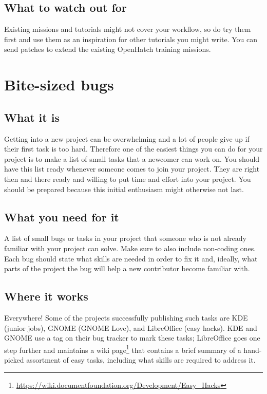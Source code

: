 \subsection{What to watch out for}
Existing missions and tutorials might not cover your workflow, so do try them first and use them as an inspiration for other tutorials you might write. You can send patches to extend the existing OpenHatch training missions.

\section{Bite-sized bugs}
\subsection{What it is}
Getting into a new project can be overwhelming and a lot of people give up if their first task is too hard. Therefore one of the easiest things you can do for your project is to make a list of small tasks that a newcomer can work on. You should have this list ready whenever someone comes to join your project. They are right then and there ready and willing to put time and effort into your project. You should be prepared because this initial enthusiasm might otherwise not last.

\subsection{What you need for it}
A list of small bugs or tasks in your project that someone who is not already familiar with your project can solve. Make sure to also include non-coding ones. Each bug should state what skills are needed in order to fix it and, ideally, what parts of the project the bug will help a new contributor become familiar with.

\subsection{Where it works}
Everywhere! Some of the projects successfully publishing such tasks are KDE (junior jobs), GNOME (GNOME Love), and LibreOffice (easy hacks). KDE and GNOME use a tag on their bug tracker to mark these tasks; LibreOffice goes one step further and maintains a wiki page\footnote{\url{https://wiki.documentfoundation.org/Development/Easy_Hacks}} that contains a brief summary of a hand-picked assortment of easy tasks, including what skills are required to address it.

